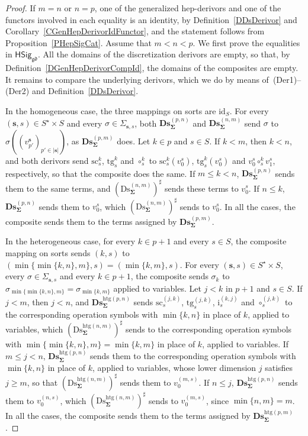 \documentclass[a4paper, reqno]{amsbook}
\newcommand{\bb}[1]{\ensuremath{\lvert #1 \rvert}}
\newcommand{\sig}[1]{\mathbf{#1}}             %
\newcommand{\gd}{\mathfrak{gd}}              %
\newcommand{\htg}{\mathrm{htg}}                %
\newcommand{\id}{\mathrm{id}}
\newcommand{\src}{\mathrm{sc}}
\newcommand{\tgt}{\mathrm{tg}}
\newcommand{\Ds}{\mathrm{Ds}}
\newcommand{\bDs}{\mathbf{Ds}}
\theoremstyle{plain}
\theoremstyle{definition}
\begin{document}
\begin{proof}
If $m=n$ or $n=p$, one of the generalized hep-derivors and one of the functors involved in each equality is an identity, by Definition~\ref{DDsDerivor} and Corollary~\ref{CGenHepDerivorIdFunctor}, and the statement follows from Proposition~\ref{PHepSigCat}.
Assume that $m<n<p$.
We first prove the equalities in $\mathsf{HSig}_{\gd}$.
All the domains of the discretization derivors are empty, so that, by Definition~\ref{DGenHepDerivorCompId}, the domains of the composites are empty.
It remains to compare the underlying derivors, which we do by means of~(Der1)--(Der2) and Definition~\ref{DDsDerivor}.

In the homogeneous case, the three mappings on sorts are $\id_{S}$.
For every $(\mathbf{s},s)\in S^{\star}\times S$ and every $\sigma\in\Sigma_{\mathbf{s},s}$, both $\bDs^{(p,n)}_{\sig{\Sigma}}$ and $\bDs^{(n,m)}_{\sig{\Sigma}}$ send $\sigma$ to $\sigma((v^{\mathbf{s}}_{p'})_{p'\in\bb{\mathbf{s}}})$, as $\bDs^{(p,m)}_{\sig{\Sigma}}$ does.
Let $k\in p$ and $s\in S$.
If $k<m$, then $k<n$, and both derivors send $\src^{k}_{s}$, $\tgt^{k}_{s}$ and $\circ^{k}_{s}$ to $\src^{k}_{s}(v^{s}_{0})$, $\tgt^{k}_{s}(v^{s}_{0})$ and $v^{s}_{0}\circ^{k}_{s}v^{s}_{1}$, respectively, so that the composite does the same.
If $m\leq k<n$, $\bDs^{(p,n)}_{\sig{\Sigma}}$ sends them to the same terms, and $(\Ds^{(n,m)}_{\sig{\Sigma}})^{\sharp}$ sends these terms to $v^{s}_{0}$.
If $n\leq k$, $\bDs^{(p,n)}_{\sig{\Sigma}}$ sends them to $v^{s}_{0}$, which $(\Ds^{(n,m)}_{\sig{\Sigma}})^{\sharp}$ sends to $v^{s}_{0}$.
In all the cases, the composite sends them to the terms assigned by $\bDs^{(p,m)}_{\sig{\Sigma}}$.

In the heterogeneous case, for every $k\in p+1$ and every $s\in S$, the composite mapping on sorts sends $(k,s)$ to $(\min\{\min\{k,n\},m\},s)=(\min\{k,m\},s)$.
For every $(\mathbf{s},s)\in S^{\star}\times S$, every $\sigma\in\Sigma_{\mathbf{s},s}$ and every $k\in p+1$, the composite sends $\sigma_{k}$ to $\sigma_{\min\{\min\{k,n\},m\}}=\sigma_{\min\{k,m\}}$ applied to variables.
Let $j<k$ in $p+1$ and $s\in S$.
If $j<m$, then $j<n$, and $\bDs^{\htg(p,n)}_{\sig{\Sigma}}$ sends $\src^{(j,k)}_{s}$, $\tgt^{(j,k)}_{s}$, $\mathrm{i}^{(k,j)}_{s}$ and $\circ^{(j,k)}_{s}$ to the corresponding operation symbols with $\min\{k,n\}$ in place of $k$, applied to variables, which $(\Ds^{\htg(n,m)}_{\sig{\Sigma}})^{\sharp}$ sends to the corresponding operation symbols with $\min\{\min\{k,n\},m\}=\min\{k,m\}$ in place of $k$, applied to variables.
If $m\leq j<n$, $\bDs^{\htg(p,n)}_{\sig{\Sigma}}$ sends them to the corresponding operation symbols with $\min\{k,n\}$ in place of $k$, applied to variables, whose lower dimension $j$ satisfies $j\geq m$, so that $(\Ds^{\htg(n,m)}_{\sig{\Sigma}})^{\sharp}$ sends them to $v^{(m,s)}_{0}$.
If $n\leq j$, $\bDs^{\htg(p,n)}_{\sig{\Sigma}}$ sends them to $v^{(n,s)}_{0}$, which $(\Ds^{\htg(n,m)}_{\sig{\Sigma}})^{\sharp}$ sends to $v^{(m,s)}_{0}$, since $\min\{n,m\}=m$.
In all the cases, the composite sends them to the terms assigned by $\bDs^{\htg(p,m)}_{\sig{\Sigma}}$.


\end{proof}
\end{document}
